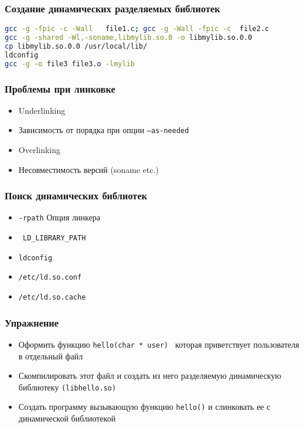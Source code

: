 \begin{frame}[fragile]
  \frametitle{Создание динамических разделяемых библиотек}
\begin{lstlisting}[language=sh]
gcc -g -fpic -c -Wall   file1.c; gcc -g -Wall -fpic -c  file2.c
gcc -g -shared -Wl,-soname,libmylib.so.0 -o libmylib.so.0.0 
cp libmylib.so.0.0 /usr/local/lib/
ldconfig 
gcc -g -o file3 file3.o -lmylib
\end{lstlisting}
\end{frame}

\begin{frame}
 \frametitle{Проблемы при линковке}
 \begin{itemize}
   \item Underlinking
   \item Зависимость от порядка при опции {\tt --as-needed} 
   \item Overlinking
   \item Несовместимость версий (soname etc.)
 \end{itemize}
\end{frame}

\begin{frame}[fragile]
  \frametitle{Поиск динамических библиотек}
  \begin{itemize}
    \item {\tt -rpath} Опция линкера
    \item \verb+ LD_LIBRARY_PATH +
    \item {\tt ldconfig}
    \item {\tt /etc/ld.so.conf}
    \item {\tt /etc/ld.so.cache}
  \end{itemize}
\end{frame}

\begin{frame}
  \frametitle{Упражнение}
  \begin{itemize}
    \item Оформить функцию {\tt hello(char * user) } которая приветствует пользователя в отдельный файл
    \item Скомпилировать этот файл и создать из него разделяемую динамическую библиотеку {\tt (libhello.so)}
    \item Создать программу вызывающую функцию {\tt hello()} и слинковать ее с динамической библиотекой
  \end{itemize}
\end{frame}
